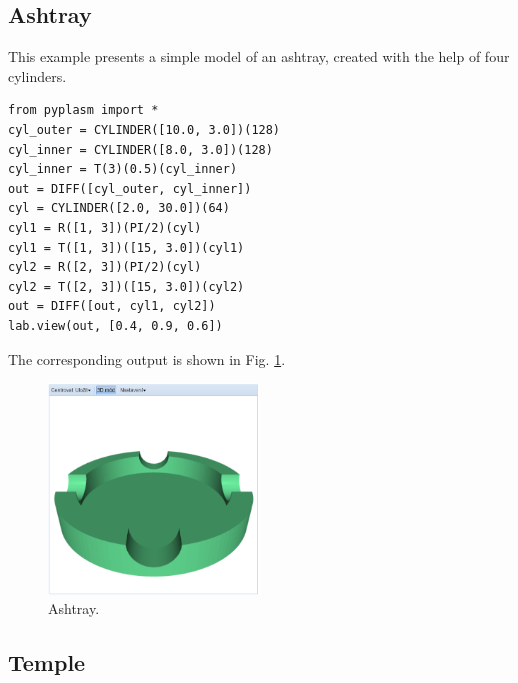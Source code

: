 \documentclass[article,A4,12pt]{llncs}
\begin{document}
\subsection{Ashtray}

This example presents a simple model of an ashtray,
created with the help of four cylinders.
{\small
\begin{verbatim}
from pyplasm import *
cyl_outer = CYLINDER([10.0, 3.0])(128)
cyl_inner = CYLINDER([8.0, 3.0])(128)
cyl_inner = T(3)(0.5)(cyl_inner)
out = DIFF([cyl_outer, cyl_inner])
cyl = CYLINDER([2.0, 30.0])(64)
cyl1 = R([1, 3])(PI/2)(cyl)
cyl1 = T([1, 3])([15, 3.0])(cyl1)
cyl2 = R([2, 3])(PI/2)(cyl)
cyl2 = T([2, 3])([15, 3.0])(cyl2)
out = DIFF([out, cyl1, cyl2])
lab.view(out, [0.4, 0.9, 0.6])
\end{verbatim}
}
\noindent
The corresponding output is shown in Fig. \ref{fig:ashtray}.


\begin{figure}[!ht]
\begin{center}
\includegraphics[width=0.5\textwidth]{img/ashtray.png}
\end{center}
\vspace{-2mm}
\caption{Ashtray.}
\label{fig:ashtray}
\end{figure}
\noindent

\subsection{Temple}
\end{document}
